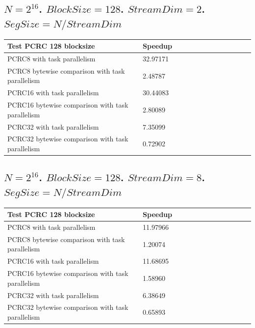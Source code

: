 \documentclass[fleqn]{IEEEtran}
\begin{document}
\subsection{$N=2^{16}$. $BlockSize=128$. $StreamDim=2$. $SegSize=N/StreamDim$}
\begin{footnotesize}
\begin{tabular}{l|l|l|l|l|r|r|r|r|r|r||c|c|}
\toprule
\textbf{Test PCRC 128 blocksize} & \textbf{Speedup} \\
\midrule
PCRC8 with task parallelism                     &	32.97171 \\
PCRC8 bytewise comparison with task parallelism &	2.48787  \\
PCRC16 with task parallelism                     &	30.44083 \\
PCRC16 bytewise comparison with task parallelism &	2.80089  \\
PCRC32 with task parallelism                     &	7.35099  \\
PCRC32 bytewise comparison with task parallelism &	0.72902  \\
\bottomrule
\end{tabular}
\end{footnotesize}

\subsection{$N=2^{16}$. $BlockSize=128$. $StreamDim=8$. $SegSize=N/StreamDim$}
\begin{footnotesize}
\begin{tabular}{l|l|l|l|l|r|r|r|r|r|r||c|c|}
\toprule
\textbf{Test PCRC 128 blocksize} & \textbf{Speedup} \\
\midrule
PCRC8 with task parallelism                     &	11.97966 \\
PCRC8 bytewise comparison with task parallelism &	1.20074  \\
PCRC16 with task parallelism                     &	11.68695 \\
PCRC16 bytewise comparison with task parallelism &	1.58960  \\
PCRC32 with task parallelism                     &	6.38649  \\
PCRC32 bytewise comparison with task parallelism &	0.65893  \\
\bottomrule
\end{tabular}
\end{footnotesize}
\end{document}
